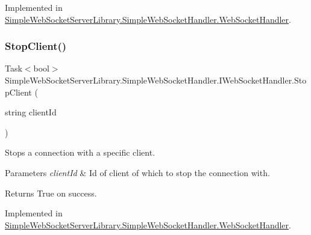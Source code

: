 Implemented in \mbox{\hyperlink{class_simple_web_socket_server_library_1_1_simple_web_socket_handler_1_1_web_socket_handler_a77f5d9d54d3a2a3032b5ce1f21d5ef34}{Simple\+Web\+Socket\+Server\+Library.\+Simple\+Web\+Socket\+Handler.\+Web\+Socket\+Handler}}.

\mbox{\label{interface_simple_web_socket_server_library_1_1_simple_web_socket_handler_1_1_i_web_socket_handler_a38b3104f285279f6fd3101765b2f0076}} 
\subsubsection{\texorpdfstring{Stop\+Client()}{StopClient()}\hspace{0.1cm}{\footnotesize\ttfamily [1/2]}}
{\footnotesize\ttfamily Task$<$bool$>$ Simple\+Web\+Socket\+Server\+Library.\+Simple\+Web\+Socket\+Handler.\+I\+Web\+Socket\+Handler.\+Stop\+Client (\begin{DoxyParamCaption}\item[{string}]{client\+Id }\end{DoxyParamCaption})}



Stops a connection with a specific client. 


\begin{DoxyParams}{Parameters}
{\em client\+Id} & Id of client of which to stop the connection with.\\
\hline
\end{DoxyParams}
\begin{DoxyReturn}{Returns}
True on success.
\end{DoxyReturn}


Implemented in \mbox{\hyperlink{class_simple_web_socket_server_library_1_1_simple_web_socket_handler_1_1_web_socket_handler_a9783bb897a6a9708ab861edc102df693}{Simple\+Web\+Socket\+Server\+Library.\+Simple\+Web\+Socket\+Handler.\+Web\+Socket\+Handler}}.

